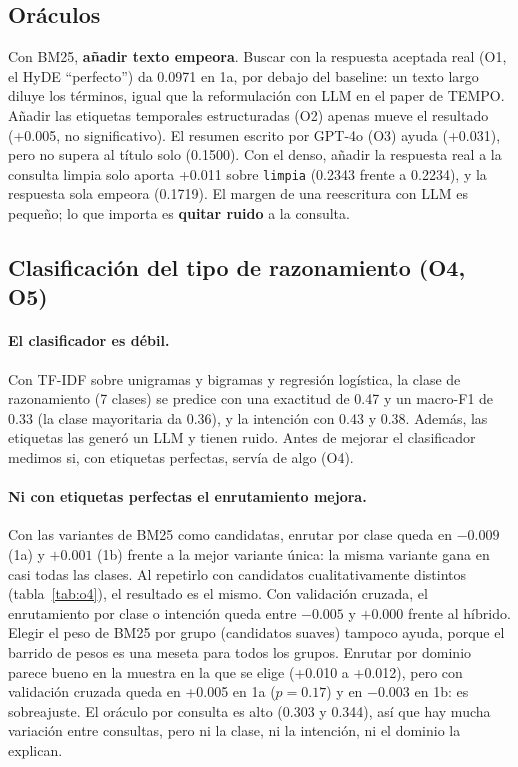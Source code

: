 \documentclass[11pt,a4paper]{article}
\begin{document}
\subsection{Oráculos}
\label{sec:res-oraculos}

Con BM25, \textbf{añadir texto empeora}. Buscar con la respuesta aceptada real (O1, el HyDE ``perfecto'') da 0.0971 en 1a, por debajo del baseline: un texto largo diluye los términos, igual que la reformulación con LLM en el paper de TEMPO. Añadir las etiquetas temporales estructuradas (O2) apenas mueve el resultado (+0.005, no significativo). El resumen escrito por GPT-4o (O3) ayuda (+0.031), pero no supera al título solo (0.1500). Con el denso, añadir la respuesta real a la consulta limpia solo aporta +0.011 sobre \texttt{limpia} (0.2343 frente a 0.2234), y la respuesta sola empeora (0.1719). El margen de una reescritura con LLM es pequeño; lo que importa es \textbf{quitar ruido} a la consulta.

\subsection{Clasificación del tipo de razonamiento (O4, O5)}
\label{sec:res-razonamiento}

\paragraph{El clasificador es débil.} Con TF-IDF sobre unigramas y bigramas y regresión logística, la clase de razonamiento (7 clases) se predice con una exactitud de 0.47 y un macro-F1 de 0.33 (la clase mayoritaria da 0.36), y la intención con 0.43 y 0.38. Además, las etiquetas las generó un LLM y tienen ruido. Antes de mejorar el clasificador medimos si, con etiquetas perfectas, servía de algo (O4).

\paragraph{Ni con etiquetas perfectas el enrutamiento mejora.} Con las variantes de BM25 como candidatas, enrutar por clase queda en $-0.009$ (1a) y $+0.001$ (1b) frente a la mejor variante única: la misma variante gana en casi todas las clases. Al repetirlo con candidatos cualitativamente distintos (tabla~\ref{tab:o4}), el resultado es el mismo. Con validación cruzada, el enrutamiento por clase o intención queda entre $-0.005$ y $+0.000$ frente al híbrido. Elegir el peso de BM25 por grupo (candidatos suaves) tampoco ayuda, porque el barrido de pesos es una meseta para todos los grupos. Enrutar por dominio parece bueno en la muestra en la que se elige (+0.010 a +0.012), pero con validación cruzada queda en +0.005 en 1a ($p = 0.17$) y en $-0.003$ en 1b: es sobreajuste. El oráculo por consulta es alto (0.303 y 0.344), así que hay mucha variación entre consultas, pero ni la clase, ni la intención, ni el dominio la explican.
\end{document}
